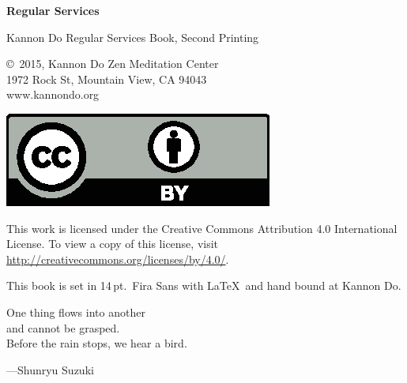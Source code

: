 \documentclass{chantbook}
\begin{document}

\frontmatter
\begin{titlepage}
{\Huge\bf Regular Services}
\end{titlepage}

\begin{colophon}
Kannon Do Regular Services Book, Second Printing

\bigskip

\copyright\ 2015, Kannon Do Zen Meditation Center\\
1972 Rock St, Mountain View, CA 94043\\
www.kannondo.org

\includegraphics{by}

This work is licensed under the Creative Commons Attribution 4.0 International
License. To view a copy of this license, visit
\url{http://creativecommons.org/licenses/by/4.0/}.

\bigskip

This book is set in 14\,pt.\ Fira Sans with \LaTeX\ and hand bound at Kannon Do.
\end{colophon}

\begin{dedication}
One thing flows into another\\
and cannot be grasped.\\
Before the rain stops, we hear a bird.

---Shunryu Suzuki
\end{dedication}

\cleardoublepage
\end{document}
